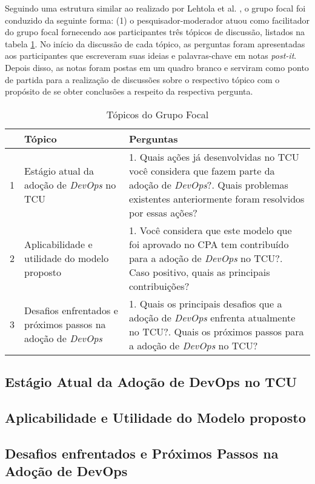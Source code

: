 Seguindo uma estrutura similar ao realizado por Lehtola et al. \cite{requirementes_priorization_in_practice},
o grupo focal foi conduzido da seguinte forma: (1) o pesquisador-moderador atuou
como facilitador do grupo focal fornecendo aos participantes três tópicos de
discussão, listados na tabela \ref{tabela_topicos}. No início da discussão de
cada tópico, as perguntas foram apresentadas aos participantes que escreveram
suas ideias e palavras-chave em notas {\it post-it}. Depois disso, as notas
foram postas em um quadro branco e serviram como ponto de partida para a
realização de discussões sobre o respectivo tópico com o propósito de se obter
conclusões a respeito da respectiva pergunta.

\begin{table}[hb!]
\centering
\caption{Tópicos do Grupo Focal}
\label{tabela_topicos}
\begin{tabular}{|p{0.3cm}|p{6.4cm}|p{7cm}|} \hline
& \textbf{Tópico} & \textbf{Perguntas} \\ \hline

1 & Estágio atual da adoção de {\it DevOps} no \acrshort{TCU} &
1. Quais ações já desenvolvidas no \acrshort{TCU} você considera que fazem parte da adoção de {\it DevOps}?\newline\newline
2. Quais problemas existentes anteriormente foram resolvidos por essas ações? \\ \hline

2 & Aplicabilidade e utilidade do modelo proposto &
1. Você considera que este modelo que foi aprovado no \acrshort{CPA} tem contribuído para a adoção de {\it DevOps} no \acrshort{TCU}?\newline\newline
2. Caso positivo, quais as principais contribuições? \\ \hline

3 & Desafios enfrentados e próximos passos na adoção de {\it DevOps} &
1. Quais os principais desafios que a adoção de {\it DevOps} enfrenta atualmente no \acrshort{TCU}?\newline\newline
2. Quais os próximos passos para a adoção de {\it DevOps} no \acrshort{TCU}?\\ \hline

\end{tabular}
\end{table}

\subsection{Estágio Atual da Adoção de DevOps no TCU}

\subsection{Aplicabilidade e Utilidade do Modelo proposto}

\subsection{Desafios enfrentados e Próximos Passos na Adoção de DevOps}
